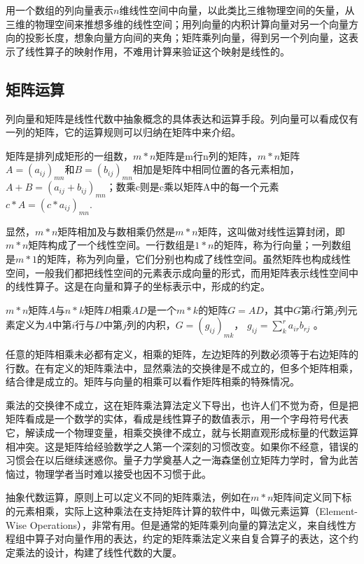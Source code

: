 用一个数组的列向量表示$ n $维线性空间中向量，以此类比三维物理空间的矢量，从三维的物理空间来推想多维的线性空间；用列向量的内积计算向量对另一个向量方向的投影长度，想象向量方向间的夹角；矩阵乘列向量，得到另一个列向量，这表示了线性算子的映射作用，不难用计算来验证这个映射是线性的。

\subsection{矩阵运算}
列向量和矩阵是线性代数中抽象概念的具体表达和运算手段。列向量可以看成仅有一列的矩阵，它的运算规则可以归纳在矩阵中来介绍。

矩阵是排列成矩形的一组数，$ m*n $矩阵是m行n列的矩阵，$ m*n $矩阵$ A=(a_{ij})_{mn} $和$ B=(b_{ij})_{mn} $相加是矩阵中相同位置的各元素相加，$ A+B=(a_{ij}+b_{ij})_{mn} $；数乘c则是c乘以矩阵A中的每一个元素$ c*A=(c*a_{ij})_{mn} $.

显然，$ m*n $矩阵相加及与数相乘仍然是$ m*n $矩阵，这叫做对线性运算封闭，即$ m*n $矩阵构成了一个线性空间。一行数组是$ 1*n $的矩阵，称为行向量；一列数组是$ m*1 $的矩阵，称为列向量，它们分别也构成了线性空间。虽然矩阵也构成线性空间，一般我们都把线性空间的元素表示成向量的形式，而用矩阵表示线性空间中的线性算子。这是在向量和算子的坐标表示中，形成的约定。

$ m*n $矩阵$ A $与$ n*k $矩阵$ D $相乘$ AD $是一个$ m*k $的矩阵$ G=AD $，其中$ G $第$ i $行第$ j $列元素定义为$ A $中第$ i $行与$ D $中第$ j $列的内积，$ G=(g_{ij})_{mk} $， $ g_{ij}= \sum_{k}^{r}a_{ir}b_{rj} $ 。

任意的矩阵相乘未必都有定义，相乘的矩阵，左边矩阵的列数必须等于右边矩阵的行数。在有定义的矩阵乘法中，显然乘法的交换律是不成立的，但多个矩阵相乘，结合律是成立的。矩阵与向量的相乘可以看作矩阵相乘的特殊情况。

乘法的交换律不成立，这在矩阵乘法算法定义下导出，也许人们不觉为奇，但是把矩阵看成是一个数学的实体，看成是线性算子的数值表示，用一个字母符号代表它，解读成一个物理变量，相乘交换律不成立，就与长期直观形成标量的代数运算相冲突。这是矩阵给经验数学之人第一个深刻的习惯改变。如果你不经意，错误的习惯会在以后继续迷惑你。量子力学奠基人之一海森堡创立矩阵力学时，曾为此苦恼过，物理学者当时难以接受也因不习惯于此。

抽象代数运算，原则上可以定义不同的矩阵乘法，例如在$ m*n $矩阵间定义同下标的元素相乘，实际上这种乘法在支持矩阵计算的软件中，叫做元素运算（Element-Wise Operations），非常有用。但是通常的矩阵乘列向量的算法定义，来自线性方程组中算子对向量作用的表达，约定的矩阵乘法定义来自复合算子的表达，这个约定乘法的设计，构建了线性代数的大厦。

